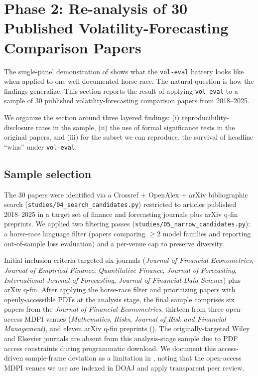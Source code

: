 \section{Phase 2: Re-analysis of 30 Published Volatility-Forecasting Comparison Papers}\label{sec:phase2}

\sloppy

The single-panel demonstration of  shows what the \texttt{vol-eval} battery looks like when applied to one well-documented horse race. The natural question is how the findings generalize. This section reports the result of applying \texttt{vol-eval} to a sample of 30 published volatility-forecasting comparison papers from 2018--2025.

We organize the section around three layered findings: (i) reproducibility-disclosure rates in the sample, (ii) the use of formal significance tests in the original papers, and (iii) for the subset we can reproduce, the survival of headline ``wins'' under \texttt{vol-eval}.

\subsection{Sample selection}\label{sec:phase2_sample}

The 30 papers were identified via a Crossref + OpenAlex + arXiv bibliographic search (\texttt{studies/04\_search\_candidates.py}) restricted to articles published 2018--2025 in a target set of finance and forecasting journals plus arXiv q-fin preprints. We applied two filtering passes (\texttt{studies/05\_narrow\_candidates.py}): a horse-race language filter (papers comparing $\geq 2$ model families and reporting out-of-sample loss evaluation) and a per-venue cap to preserve diversity.

Initial inclusion criteria targeted six journals (\emph{Journal of Financial Econometrics}, \emph{Journal of Empirical Finance}, \emph{Quantitative Finance}, \emph{Journal of Forecasting}, \emph{International Journal of Forecasting}, \emph{Journal of Financial Data Science}) plus arXiv q-fin. After applying the horse-race filter and prioritizing papers with openly-accessible PDFs at the analysis stage, the final sample comprises six papers from the \emph{Journal of Financial Econometrics}, thirteen from three open-access MDPI venues (\emph{Mathematics}, \emph{Risks}, \emph{Journal of Risk and Financial Management}), and eleven arXiv q-fin preprints (). The originally-targeted Wiley and Elsevier journals are absent from this analysis-stage sample due to PDF access constraints during programmatic download. We document this access-driven sample-frame deviation as a limitation in , noting that the open-access MDPI venues we use are indexed in DOAJ and apply transparent peer review.

